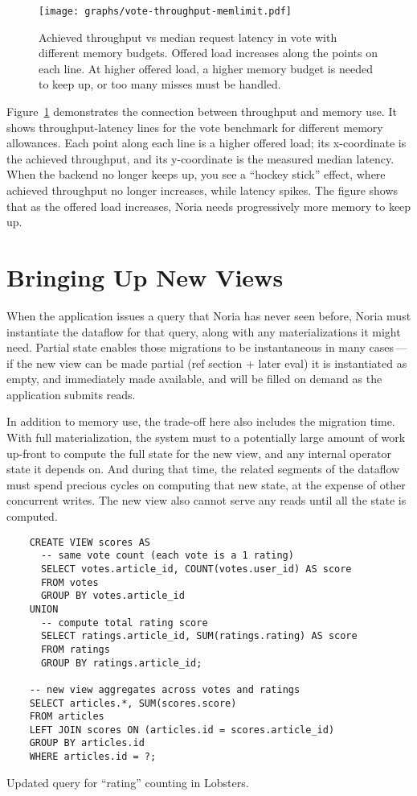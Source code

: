 \begin{figure}[h]
  \centering
  \texttt{[image: graphs/vote-throughput-memlimit.pdf]}
  \caption{Achieved throughput vs median request latency in vote with
  different memory budgets. Offered load increases along the points on each
  line. At higher offered load, a higher memory budget is needed to keep up, or
  too many misses must be handled.}
  \label{f:vote-throughput-memlimit}
\end{figure}

Figure~\ref{f:vote-throughput-memlimit} demonstrates the connection between
throughput and memory use. It shows throughput-latency lines for the vote
benchmark for different memory allowances. Each point along each line is a
higher offered load; its x-coordinate is the achieved throughput, and its
y-coordinate is the measured median latency. When the backend no longer keeps
up, you see a ``hockey stick'' effect, where achieved throughput no longer
increases, while latency spikes. The figure shows that as the offered load
increases, Noria needs progressively more memory to keep up.

\section{Bringing Up New Views}
\label{s:eval:mig}

When the application issues a query that Noria has never seen before, Noria must
instantiate the dataflow for that query, along with any materializations it
might need. Partial state enables those migrations to be instantaneous in many
cases\,---\,if the new view can be made partial (ref section + later eval) it is
instantiated as empty, and immediately made available, and will be filled on
demand as the application submits reads.

In addition to memory use, the trade-off here also includes the migration time.
With full materialization, the system must to a potentially large amount of work
up-front to compute the full state for the new view, and any internal operator
state it depends on. And during that time, the related segments of the dataflow
must spend precious cycles on computing that new state, at the expense of other
concurrent writes. The new view also cannot serve any reads until all the state
is computed.

\begin{listing}[h]
  \begin{verbatim}
    CREATE VIEW scores AS
      -- same vote count (each vote is a 1 rating)
      SELECT votes.article_id, COUNT(votes.user_id) AS score
      FROM votes
      GROUP BY votes.article_id
    UNION
      -- compute total rating score
      SELECT ratings.article_id, SUM(ratings.rating) AS score
      FROM ratings
      GROUP BY ratings.article_id;

    -- new view aggregates across votes and ratings
    SELECT articles.*, SUM(scores.score)
    FROM articles
    LEFT JOIN scores ON (articles.id = scores.article_id)
    GROUP BY articles.id
    WHERE articles.id = ?;
  \end{verbatim}
  \caption{Updated query for ``rating'' counting in Lobsters.}
  \label{l:ratings}
\end{listing}

